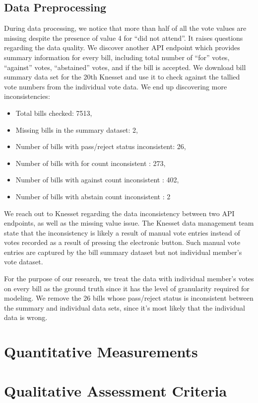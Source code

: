 \subsection{Data Preprocessing}

During data processing, we notice that more than half of all the vote values
are missing despite the presence of value 4 for ``did not attend''.
It raises questions regarding the data quality.
We discover another API endpoint which provides summary information for
every bill, including total number of ``for'' votes, ``against'' votes,
``abstained'' votes, and if the bill is accepted.
We download bill summary data set for the 20th Knesset and use it
to check against the tallied vote numbers from the individual vote data.
We end up discovering more inconsistencies:

\begin{itemize}
  \item Total bills checked: 7513,
  \item Missing bills in the summary dataset: 2,
  \item Number of bills with pass/reject status inconsistent: 26,
  \item Number of bills with for count inconsistent : 273,
  \item Number of bills with against count inconsistent : 402,
  \item Number of bills with abstain count inconsistent : 2
\end{itemize}

We reach out to Knesset regarding the data inconsistency between
two API endpoints, as well as the missing value issue.
The Knesset data management team state that the inconsistency
is likely a result of manual vote entries instead of votes recorded
as a result of pressing the electronic button.
Such manual vote entries are captured by the bill summary dataset
but not individual member's vote dataset.

For the purpose of our research, we treat the data with individual member's
votes on every bill as the ground truth since it has the level of granularity
required for modeling.
We remove the 26 bills whose pass/reject status is inconsistent between
the summary and individual data sets, since it's most likely that
the individual data is wrong.

\section{Quantitative Measurements}
\section{Qualitative Assessment Criteria}
